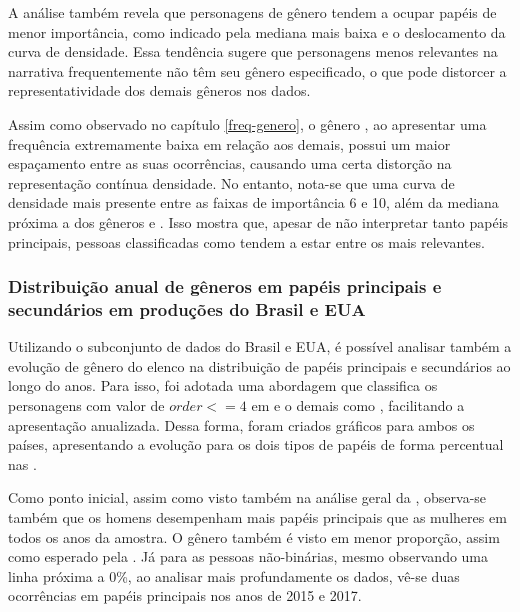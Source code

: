 A análise também revela que personagens de gênero  tendem a ocupar papéis de menor importância, como indicado pela mediana mais baixa e o deslocamento da curva de densidade. Essa tendência sugere que personagens menos relevantes na narrativa frequentemente não têm seu gênero especificado, o que pode distorcer a representatividade dos demais gêneros nos dados.

Assim como observado no capítulo \ref{freq-genero}, o gênero , ao apresentar uma frequência extremamente baixa em relação aos demais, possui um maior espaçamento entre as suas ocorrências, causando uma certa distorção na representação contínua densidade. No entanto, nota-se que uma curva de densidade mais presente entre as faixas de importância 6 e 10, além da mediana próxima a  dos gêneros  e . Isso mostra que, apesar de não interpretar tanto papéis principais, pessoas classificadas como  tendem a estar entre os mais relevantes.

\subsubsection{Distribuição anual de gêneros em papéis principais e secundários em produções do Brasil e EUA}
Utilizando o subconjunto de dados do Brasil e EUA, é possível analisar também a evolução de gênero do elenco na distribuição de papéis principais e secundários ao longo do anos. Para isso, foi adotada uma abordagem que classifica os personagens com valor de $\textit{order} <= 4$ em  e o demais como , facilitando a apresentação anualizada. Dessa forma, foram criados gráficos para ambos os países, apresentando a evolução para os dois tipos de papéis de forma percentual nas .


%

Como ponto inicial, assim como visto também na análise geral da , observa-se também que os homens desempenham mais papéis principais que as mulheres em todos os anos da amostra. O gênero  também é visto em menor proporção, assim como esperado pela . Já para as pessoas não-binárias, mesmo observando uma linha próxima a 0\%, ao analisar mais profundamente os dados, vê-se duas ocorrências em papéis principais nos anos de 2015 e 2017.

